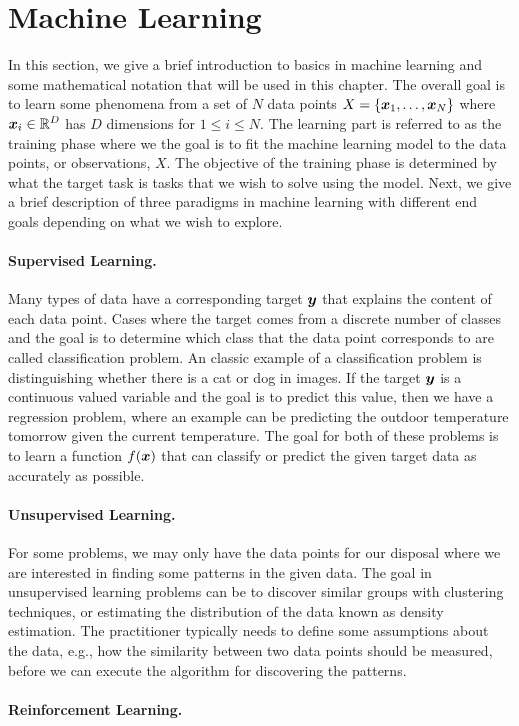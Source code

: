 \section{Machine Learning} 
\label{sec:machine_learning}

In this section, we give a brief introduction to basics in machine learning and some mathematical notation that will be used in this chapter. The overall goal is to learn some phenomena from a set of $N$ data points $X = \{{\bm{x}}_1, \dots, {\bm{x}}_N\}$ where ${\bm{x}}_i \in \mathbb{R}^{D}$ has $D$ dimensions for $1 \leq i \leq N$. The learning part is referred to as the training phase where we the goal is to fit the machine learning model to the data points, or observations, $X$. The objective of the training phase is determined by what the target task is tasks that we wish to solve using the model. Next, we give a brief description of three paradigms in machine learning with different end goals depending on what we wish to explore.

\paragraph{Supervised Learning.} Many types of data have a corresponding target ${\bm{y}}$ that explains the content of each data point. Cases where the target comes from a discrete number of classes and the goal is to determine which class that the data point corresponds to are called classification problem. An classic example of a classification problem is distinguishing whether there is a cat or dog in images. If the target ${\bm{y}}$ is a continuous valued variable and the goal is to predict this value, then we have a regression problem, where an example can be predicting the outdoor temperature tomorrow given the current temperature. The goal for both of these problems is to learn a function $f({\bm{x}})$ that can classify or predict the given target data as accurately as possible. 

\paragraph{Unsupervised Learning.} For some problems, we may only have the data points for our disposal where we are interested in finding some patterns in the given data. The goal in unsupervised learning problems can be to discover similar groups with clustering techniques, or estimating the distribution of the data known as density estimation. The practitioner typically needs to define some assumptions about the data, e.g., how the similarity between two data points should be measured, before we can execute the algorithm for discovering the patterns.

\paragraph{Reinforcement Learning.}    

